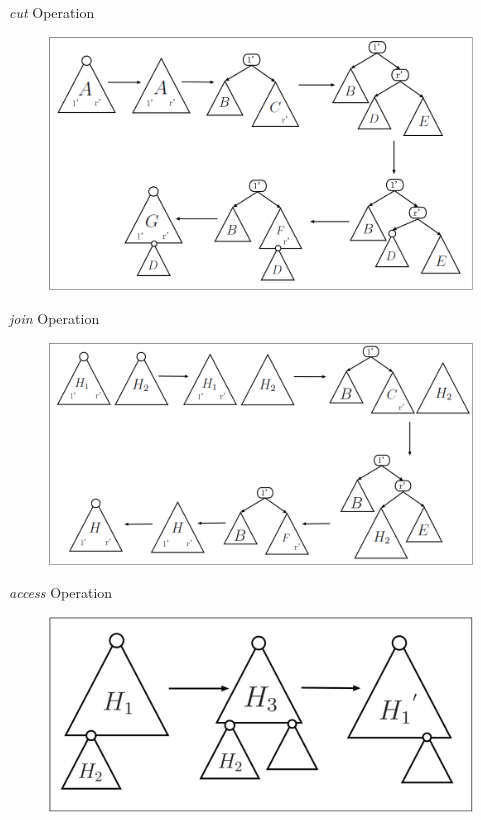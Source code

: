 \documentclass[11pt]{beamer}
\begin{document}
\begin{frame} {\textit{cut} Operation}
	\begin{figure}[H]
		\centering
		\includegraphics[width=1\textwidth]{"Medien/pres/cut"}
	\end{figure}	
\end{frame}
\begin{frame} {\textit{join} Operation}
	\begin{figure}[H]
		\centering
		\includegraphics[width=1\textwidth]{"Medien/pres/join"}
	\end{figure}	
\end{frame}

\begin{frame} {\textit{access} Operation}
	\begin{figure}[H]
		\centering
		\includegraphics[width=1\textwidth]{"Medien/pres/cutJoin"}
	\end{figure}	
\end{frame}
\end{document}
